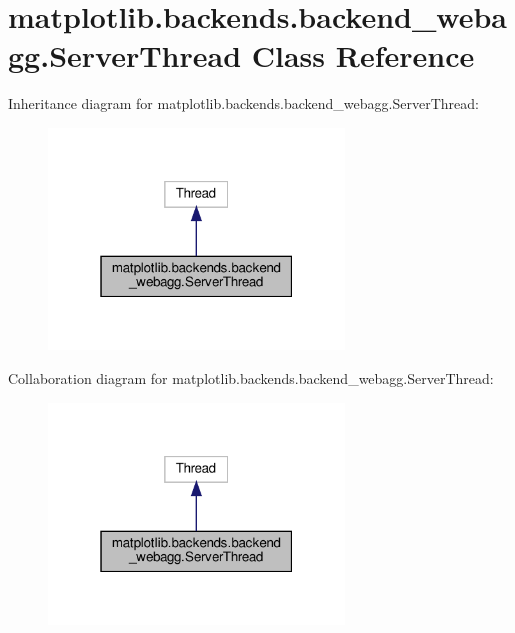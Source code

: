 \hypertarget{classmatplotlib_1_1backends_1_1backend__webagg_1_1ServerThread}{}\section{matplotlib.\+backends.\+backend\+\_\+webagg.\+Server\+Thread Class Reference}
\label{classmatplotlib_1_1backends_1_1backend__webagg_1_1ServerThread}


Inheritance diagram for matplotlib.\+backends.\+backend\+\_\+webagg.\+Server\+Thread\+:
\nopagebreak
\begin{figure}[H]
\begin{center}
\leavevmode
\includegraphics[width=223pt]{classmatplotlib_1_1backends_1_1backend__webagg_1_1ServerThread__inherit__graph}
\end{center}
\end{figure}


Collaboration diagram for matplotlib.\+backends.\+backend\+\_\+webagg.\+Server\+Thread\+:
\nopagebreak
\begin{figure}[H]
\begin{center}
\leavevmode
\includegraphics[width=223pt]{classmatplotlib_1_1backends_1_1backend__webagg_1_1ServerThread__coll__graph}
\end{center}
\end{figure}
